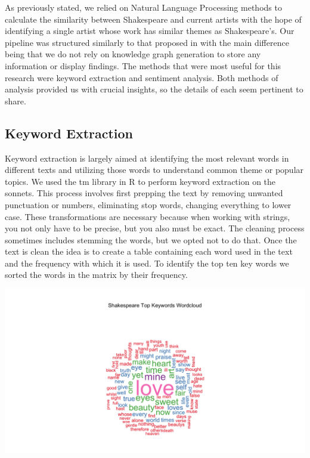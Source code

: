 \documentclass[10pt,a4paper]{article}
\begin{document}
\noindent As previously stated, we relied on Natural Language Processing methods to calculate the similarity between Shakespeare and current artists with the hope of identifying a single artist whose work has similar themes as Shakespeare’s. Our pipeline was structured similarly to that proposed in \cite{NLP-for-music} with the main difference being that we do not rely on knowledge graph generation to store any information or display findings. The methods that were most useful for this research were keyword extraction and sentiment analysis. Both methods of analysis provided us with crucial insights, so the details of each seem pertinent to share. 

\subsection{Keyword Extraction}
Keyword extraction is largely aimed at identifying the most relevant words in different texts and utilizing those words to understand common theme or popular topics.\cite{monkey} We used the tm library in R to perform keyword extraction\cite{tm} on the sonnets. This process involves first prepping the text by removing unwanted punctuation or numbers, eliminating stop words, changing everything to lower case. These transformations are necessary because when working with strings, you not only have to be precise, but you also must be exact. The cleaning process sometimes includes stemming the words, but we opted not to do that. Once the text is clean the idea is to create a table containing each word used in the text and the frequency with which it is used. To identify the top ten key words we sorted the words in the matrix by their frequency. 

\begin{center}
\includegraphics[width=14cm]{_assets/Shakespeare_Keywords_WordCloud.png}
\end{center}
\end{document}
